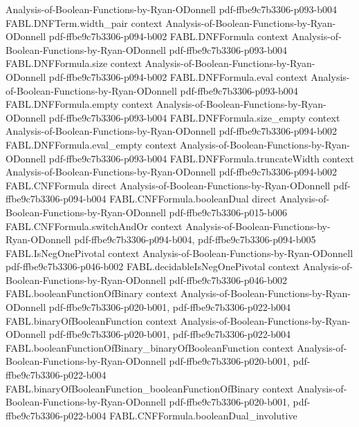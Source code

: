 \begin{theorem}
  {Analysis-of-Boolean-Functions-by-Ryan-ODonnell}
  {pdf-ffbe9c7b3306-p093-b004}
\proofstep
  {FABL.DNFTerm.width_pair}
  {context}
  {Analysis-of-Boolean-Functions-by-Ryan-ODonnell}
  {pdf-ffbe9c7b3306-p094-b002}
\proofstep
  {FABL.DNFFormula}
  {context}
  {Analysis-of-Boolean-Functions-by-Ryan-ODonnell}
  {pdf-ffbe9c7b3306-p093-b004}
\proofstep
  {FABL.DNFFormula.size}
  {context}
  {Analysis-of-Boolean-Functions-by-Ryan-ODonnell}
  {pdf-ffbe9c7b3306-p094-b002}
\proofstep
  {FABL.DNFFormula.eval}
  {context}
  {Analysis-of-Boolean-Functions-by-Ryan-ODonnell}
  {pdf-ffbe9c7b3306-p093-b004}
\proofstep
  {FABL.DNFFormula.empty}
  {context}
  {Analysis-of-Boolean-Functions-by-Ryan-ODonnell}
  {pdf-ffbe9c7b3306-p093-b004}
\proofstep
  {FABL.DNFFormula.size_empty}
  {context}
  {Analysis-of-Boolean-Functions-by-Ryan-ODonnell}
  {pdf-ffbe9c7b3306-p094-b002}
\proofstep
  {FABL.DNFFormula.eval_empty}
  {context}
  {Analysis-of-Boolean-Functions-by-Ryan-ODonnell}
  {pdf-ffbe9c7b3306-p093-b004}
\proofstep
  {FABL.DNFFormula.truncateWidth}
  {context}
  {Analysis-of-Boolean-Functions-by-Ryan-ODonnell}
  {pdf-ffbe9c7b3306-p094-b002}
\proofstep
  {FABL.CNFFormula}
  {direct}
  {Analysis-of-Boolean-Functions-by-Ryan-ODonnell}
  {pdf-ffbe9c7b3306-p094-b004}
\proofstep
  {FABL.CNFFormula.booleanDual}
  {direct}
  {Analysis-of-Boolean-Functions-by-Ryan-ODonnell}
  {pdf-ffbe9c7b3306-p015-b006}
\proofstep
  {FABL.CNFFormula.switchAndOr}
  {context}
  {Analysis-of-Boolean-Functions-by-Ryan-ODonnell}
  {pdf-ffbe9c7b3306-p094-b004,
    pdf-ffbe9c7b3306-p094-b005}
\proofstep
  {FABL.IsNegOnePivotal}
  {context}
  {Analysis-of-Boolean-Functions-by-Ryan-ODonnell}
  {pdf-ffbe9c7b3306-p046-b002}
\proofstep
  {FABL.decidableIsNegOnePivotal}
  {context}
  {Analysis-of-Boolean-Functions-by-Ryan-ODonnell}
  {pdf-ffbe9c7b3306-p046-b002}
\proofstep
  {FABL.booleanFunctionOfBinary}
  {context}
  {Analysis-of-Boolean-Functions-by-Ryan-ODonnell}
  {pdf-ffbe9c7b3306-p020-b001,
    pdf-ffbe9c7b3306-p022-b004}
\proofstep
  {FABL.binaryOfBooleanFunction}
  {context}
  {Analysis-of-Boolean-Functions-by-Ryan-ODonnell}
  {pdf-ffbe9c7b3306-p020-b001,
    pdf-ffbe9c7b3306-p022-b004}
\proofstep
  {FABL.booleanFunctionOfBinary_binaryOfBooleanFunction}
  {context}
  {Analysis-of-Boolean-Functions-by-Ryan-ODonnell}
  {pdf-ffbe9c7b3306-p020-b001,
    pdf-ffbe9c7b3306-p022-b004}
\proofstep
  {FABL.binaryOfBooleanFunction_booleanFunctionOfBinary}
  {context}
  {Analysis-of-Boolean-Functions-by-Ryan-ODonnell}
  {pdf-ffbe9c7b3306-p020-b001,
    pdf-ffbe9c7b3306-p022-b004}
\proofstep
  {FABL.CNFFormula.booleanDual_involutive}

\end{theorem}
